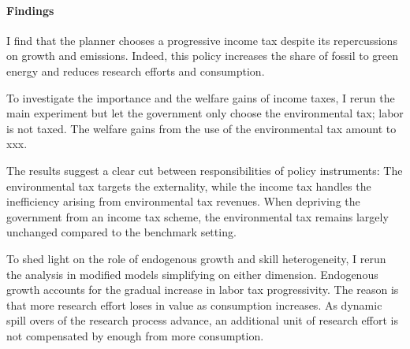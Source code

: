 
\paragraph{Findings}
I find that the planner chooses a progressive income tax despite its repercussions on growth and emissions. Indeed, this policy increases the share of fossil to green energy and reduces research efforts and consumption. %
 

To investigate the importance and the welfare gains of income taxes, I rerun the main experiment but let the government only choose the environmental tax; labor is not taxed. The welfare gains from the use of the environmental tax amount to xxx. \textit{}

The results suggest a clear cut between responsibilities of policy instruments: The environmental tax targets the externality, while the income tax handles the inefficiency arising from environmental tax revenues. When depriving the government from an income tax scheme, the environmental tax remains largely unchanged compared to the benchmark setting. 

To shed light on the role of endogenous growth and skill heterogeneity, I rerun the analysis in modified models simplifying on either dimension. 
Endogenous growth accounts for the gradual increase in labor tax progressivity. 
The reason is that more research effort loses in value as consumption increases. As dynamic spill overs of the research process advance, an additional unit of research effort is not compensated by enough from more consumption. \textit{}


